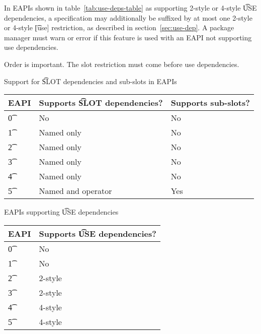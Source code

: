  In EAPIs shown in table~\ref{tab:use-deps-table} as supporting 2-style
or 4-style \t{USE} dependencies, a specification may additionally be suffixed by at most one
2-style or 4-style \t{[use]} restriction, as described in section~\ref{sec:use-dep}. A package
manager must warn or error if this feature is used with an EAPI not supporting use dependencies.

\note Order is important. The slot restriction must come before use dependencies.

\begin{centertable}{Support for \t{SLOT} dependencies and sub-slots in EAPIs}
    \label{tab:slot-deps-table}
    \begin{tabular}{ l l l }
        \toprule
            \multicolumn{1}{c}{\textbf{EAPI}} &
            \multicolumn{1}{c}{\textbf{Supports \t{SLOT} dependencies?}} &
            \multicolumn{1}{c}{\textbf{Supports sub-slots?}} \\
            \midrule
    \t{0} & No & No \\
    \t{1} & Named only & No \\
    \t{2} & Named only & No \\
    \t{3} & Named only & No \\
    \t{4} & Named only & No \\
    \t{5} & Named and operator & Yes \\
    \bottomrule
    \end{tabular}
\end{centertable}

\begin{centertable}{EAPIs supporting \t{USE} dependencies} \label{tab:use-deps-table}
    \begin{tabular}{ l l }
        \toprule
        \multicolumn{1}{c}{\textbf{EAPI}} &
        \multicolumn{1}{c}{\textbf{Supports \t{USE} dependencies?}} \\
        \midrule
    \t{0} & No \\
    \t{1} & No \\
    \t{2} & 2-style \\
    \t{3} & 2-style \\
    \t{4} & 4-style \\
    \t{5} & 4-style \\
    \bottomrule
    \end{tabular}
\end{centertable}

